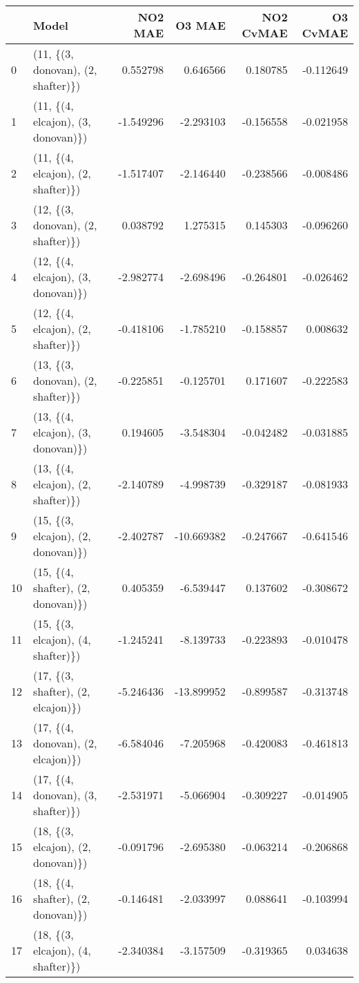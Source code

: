 \begin{tabular}{llrrrr}
\toprule
{} &                               Model &   NO2 MAE &     O3 MAE &  NO2 CvMAE &  O3 CvMAE \\
\midrule
0  &  (11, \{(3, donovan), (2, shafter)\}) &  0.552798 &   0.646566 &   0.180785 & -0.112649 \\
1  &  (11, \{(4, elcajon), (3, donovan)\}) & -1.549296 &  -2.293103 &  -0.156558 & -0.021958 \\
2  &  (11, \{(4, elcajon), (2, shafter)\}) & -1.517407 &  -2.146440 &  -0.238566 & -0.008486 \\
3  &  (12, \{(3, donovan), (2, shafter)\}) &  0.038792 &   1.275315 &   0.145303 & -0.096260 \\
4  &  (12, \{(4, elcajon), (3, donovan)\}) & -2.982774 &  -2.698496 &  -0.264801 & -0.026462 \\
5  &  (12, \{(4, elcajon), (2, shafter)\}) & -0.418106 &  -1.785210 &  -0.158857 &  0.008632 \\
6  &  (13, \{(3, donovan), (2, shafter)\}) & -0.225851 &  -0.125701 &   0.171607 & -0.222583 \\
7  &  (13, \{(4, elcajon), (3, donovan)\}) &  0.194605 &  -3.548304 &  -0.042482 & -0.031885 \\
8  &  (13, \{(4, elcajon), (2, shafter)\}) & -2.140789 &  -4.998739 &  -0.329187 & -0.081933 \\
9  &  (15, \{(3, elcajon), (2, donovan)\}) & -2.402787 & -10.669382 &  -0.247667 & -0.641546 \\
10 &  (15, \{(4, shafter), (2, donovan)\}) &  0.405359 &  -6.539447 &   0.137602 & -0.308672 \\
11 &  (15, \{(3, elcajon), (4, shafter)\}) & -1.245241 &  -8.139733 &  -0.223893 & -0.010478 \\
12 &  (17, \{(3, shafter), (2, elcajon)\}) & -5.246436 & -13.899952 &  -0.899587 & -0.313748 \\
13 &  (17, \{(4, donovan), (2, elcajon)\}) & -6.584046 &  -7.205968 &  -0.420083 & -0.461813 \\
14 &  (17, \{(4, donovan), (3, shafter)\}) & -2.531971 &  -5.066904 &  -0.309227 & -0.014905 \\
15 &  (18, \{(3, elcajon), (2, donovan)\}) & -0.091796 &  -2.695380 &  -0.063214 & -0.206868 \\
16 &  (18, \{(4, shafter), (2, donovan)\}) & -0.146481 &  -2.033997 &   0.088641 & -0.103994 \\
17 &  (18, \{(3, elcajon), (4, shafter)\}) & -2.340384 &  -3.157509 &  -0.319365 &  0.034638 \\

\end{tabular}
